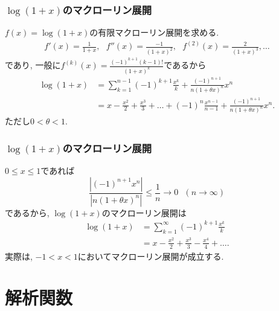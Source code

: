 \documentclass[dvipdfmx,cjk,10.2pt]{beamer}
\theoremstyle{definition}
\begin{document}



\begin{frame}
\frametitle{$\log(1+x)$のマクローリン展開}

$f(x)=\log(1+x)$の有限マクローリン展開を求める. 
\begin{align*}
f'(x)=\frac{1}{1+x}, \ \ \  f''(x)=\frac{-1}{(1+x)^2}, \ \ \  f^{(2)}(x)=\frac{2}{(1+x)^3}, \dots
\end{align*}
であり, 一般に$f^{(k)}(x)=\frac{(-1)^{k+1}(k-1)!}{(1+x)^{k}}$であるから
\begin{align*}
\log(1+x) &= \sum_{k=1}^{n-1}(-1)^{k+1}\frac{x^k}{k}+\frac{(-1)^{n+1}}{n(1+\theta x)^{n}}x^n \\
& = x-\frac{x^2}{2}+\frac{x^3}{3}+ \dots +(-1)^{n}\frac{x^{n-1}}{n-1}+\frac{(-1)^{n+1}}{n(1+\theta x)^{n}}x^n. 
\end{align*}
ただし$0<\theta < 1$. 

\end{frame}






\begin{frame}
\frametitle{$\log(1+x)$のマクローリン展開}

$0\le x\le 1$であれば
$$
\frac{|(-1)^{n+1}x^n|}{|n(1+\theta x)^{n}|} \le \frac{1}{n} \to 0 \ \ \ (n\to \infty)
$$
であるから, $\log(1+x)$のマクローリン展開は
\begin{align*}
\log(1+x) & =  \sum_{k=1}^{\infty}(-1)^{k+1}\frac{x^k}{k} \\
& =  x-\frac{x^2}{2}+\frac{x^3}{3} - \frac{x^4}{4}+\dots.
\end{align*}
実際は, $-1<x<1$においてマクローリン展開が成立する. 

\end{frame}



\section{解析関数}
\end{document}
